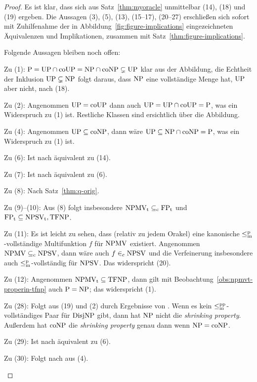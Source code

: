 \begin{proof}
Es ist klar, dass sich aus Satz~\ref{thm:myoracle} unmittelbar (14), (18) und (19) ergeben.
Die Aussagen (3), (5), (13), (15--17), (20--27) erschließen sich sofort mit Zuhilfenahme der in Abbildung~\ref{fig:figure-implications} eingezeichneten Äquivalenzen und Implikationen, zusammen mit Satz~\ref{thm:figure-implications}.

Folgende Aussagen bleiben noch offen:
\begin{prooflist}[nosep,midpenalty=0]
\item Zu (1): $\mathrm{P}=\mathrm{UP}\cap\mathrm{coUP}=\mathrm{NP}\cap\mathrm{coNP}\subsetneq\mathrm{UP}$ klar aus der Abbildung, die Echtheit der Inklusion $\mathrm{UP}\subsetneq\mathrm{NP}$ folgt daraus, dass $\mathrm{NP}$ eine vollständige Menge hat, $\mathrm{UP}$ aber nicht, nach (18).
\item Zu (2): Angenommen $\mathrm{UP}=\mathrm{coUP}$ dann auch $\mathrm{UP}=\mathrm{UP}\cap\mathrm{coUP}=\mathrm{P}$, was ein Widerspruch zu (1) ist. Restliche Klassen sind ersichtlich über die Abbildung.
\item Zu (4): Angenommen $\mathrm{UP}\subseteq\mathrm{coNP}$, dann wäre $\mathrm{UP}\subseteq \mathrm{NP}\cap\mathrm{coNP}=\mathrm{P}$, was ein Widerspruch zu (1) ist.
\item Zu (6): Ist nach \textcite[Thm.~4]{fenner_inverting_2003} äquivalent zu (14).
\item Zu (7): Ist nach \textcite[Thm.~14]{fenner_inverting_2003} äquivalent zu (6).
\item Zu (8): Nach Satz~\ref{thm:q-orig}.
\item Zu (9)–(10): Aus (8) folgt insbesondere $\mathrm{NPMV_t}\subseteq_\mathrm{c} \mathrm{FP}_\mathrm{t}$ und $\mathrm{FP}_\mathrm{t}\subseteq \mathrm{NPSV_t}, \mathrm{TFNP}$.
\item Zu (11): Es ist leicht zu sehen, dass (relativ zu jedem Orakel) eine kanonische $\leq_\mathrm{m}^\mathrm{p}$-vollständige Multifunktion $f$ für $\mathrm{NPMV}$ existiert. Angenommen $\mathrm{NPMV} \subseteq_{\mathrm{c}} \mathrm{NPSV}$, dann wäre auch $f\in_\mathrm{c} \mathrm{NPSV}$ und die Verfeinerung insbesondere auch $\leq_\mathrm{m}^\mathrm{p}$-vollständig für $\mathrm{NPSV}$.
    Das widerspricht (20). 
\item Zu (12): Angenommen $\mathrm{NPMV_t}\subseteq \mathrm{TFNP}$, dann gilt mit Beobachtung~\ref{obs:npmvt-properin-tfnp} auch $\mathrm{P}=\mathrm{NP}$; das widerspricht (1).
\item Zu (28): Folgt aus (19) und (2) durch Ergebnisse von \textcite{glaser_shrinking_2011}. Wenn es kein $\leq_\mathrm{m}^\mathrm{pp}$-vollständiges Paar für $\mathrm{DisjNP}$ gibt, dann hat $\mathrm{NP}$ nicht die \emph{shrinking property}. Außerdem hat $\mathrm{coNP}$ die \emph{shrinking property} genau dann wenn $\mathrm{NP}=\mathrm{coNP}$.
\item Zu (29): Ist nach \textcite{glaser_shrinking_2011} äquivalent zu (6).
\item Zu (30): Folgt nach \textcite{glaser_shrinking_2011} aus (4).
\end{prooflist}
\end{proof}




